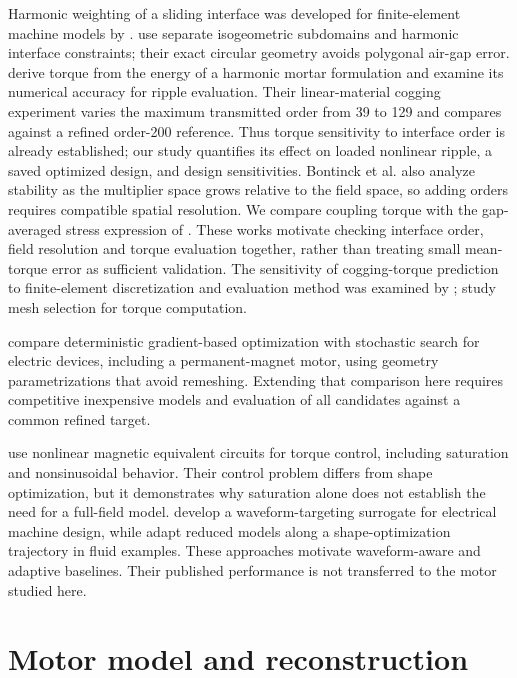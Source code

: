 \documentclass{anvil-paper}
\begin{document}
Harmonic weighting of a sliding interface was developed for finite-element
machine models by \citet{degersem2004harmonic}.
\citet{bontinck2018isogeometric} use separate isogeometric subdomains and
harmonic interface constraints; their exact circular geometry avoids
polygonal air-gap error. \citet{egger2022torque} derive torque from the
energy of a harmonic mortar formulation and examine its numerical
accuracy for ripple evaluation. Their linear-material cogging experiment
varies the maximum transmitted order from 39 to 129 and compares against
a refined order-200 reference. Thus torque sensitivity to interface order
is already established; our study quantifies its effect on loaded nonlinear
ripple, a saved optimized design, and design sensitivities.
Bontinck et al. also analyze stability as the multiplier space grows
relative to the field space, so adding orders requires compatible spatial
resolution. We compare coupling torque with the
gap-averaged stress expression of \citet{arkkio1987}. These works motivate
checking interface order, field resolution and torque evaluation together,
rather than treating small mean-torque error as sufficient validation.
The sensitivity of cogging-torque prediction to finite-element
discretization and evaluation method was examined by \citet{howe1992cogging};
\citet{arkkio2012proper} study mesh selection for torque computation.

\citet{ion2018robust} compare deterministic gradient-based optimization
with stochastic search for electric devices, including a permanent-magnet
motor, using geometry parametrizations that avoid remeshing. Extending
that comparison here requires competitive inexpensive models and evaluation
of all candidates against a common refined target.

\citet{kemmetmueller2015} use nonlinear magnetic equivalent circuits for
torque control, including saturation and nonsinusoidal behavior. Their
control problem differs from shape optimization, but it demonstrates why
saturation alone does not establish the need for a full-field model.
\citet{roomi2022} develop a waveform-targeting surrogate for electrical
machine design, while \citet{wen2023} adapt reduced models along a
shape-optimization trajectory in fluid examples. These approaches motivate
waveform-aware and adaptive baselines. Their published performance is not
transferred to the motor studied here.

\section{Motor model and reconstruction}
\end{document}
